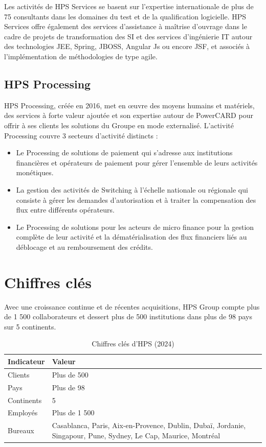 Les activités de HPS Services se basent sur l'expertise internationale de plus de 75 consultants dans les domaines du test et de la qualification logicielle. HPS Services offre également des services d'assistance à maîtrise d'ouvrage dans le cadre de projets de transformation des SI et des services d'ingénierie IT autour des technologies JEE, Spring, JBOSS, Angular Js ou encore JSF, et associés à l'implémentation de méthodologies de type agile.

\subsection{HPS Processing}

HPS Processing, créée en 2016, met en \oe uvre des moyens humains et matériels, des services à forte valeur ajoutée et son expertise autour de PowerCARD pour offrir à ses clients les solutions du Groupe en mode externalisé. L'activité Processing couvre 3 secteurs d'activité distincts :

\begin{itemize}[leftmargin=*]
\item Le Processing de solutions de paiement qui s'adresse aux institutions financières et opérateurs de paiement pour gérer l'ensemble de leurs activités monétiques.
\item La gestion des activités de Switching à l'échelle nationale ou régionale qui consiste à gérer les demandes d'autorisation et à traiter la compensation des flux entre différents opérateurs.
\item Le Processing de solutions pour les acteurs de micro finance pour la gestion complète de leur activité et la dématérialisation des flux financiers liés au déblocage et au remboursement des crédits.
\end{itemize}

\section{Chiffres clés}

Avec une croissance continue et de récentes acquisitions, HPS Group compte plus de 1 500 collaborateurs et dessert plus de 500 institutions dans plus de 98 pays sur 5 continents.

\begin{table}[H]
\centering
\caption{Chiffres clés d'HPS (2024)}
\begin{tabularx}{0.9\textwidth}{l X}
\toprule
\textbf{Indicateur} & \textbf{Valeur} \\
\midrule
Clients & Plus de 500 \\
Pays & Plus de 98 \\
Continents & 5 \\
Employés & Plus de 1 500 \\
Bureaux & Casablanca, Paris, Aix-en-Provence, Dublin, Dubaï, Jordanie, Singapour, Pune, Sydney, Le Cap, Maurice, Montréal \\
\bottomrule
\end{tabularx}
\end{table}

